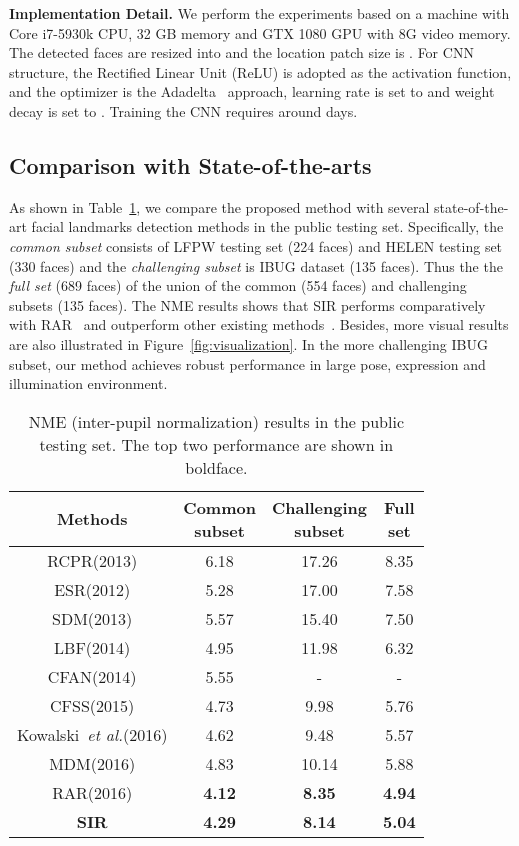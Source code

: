 \documentclass[letterpaper]{article} \usepackage{aaai18}  \usepackage{times}  \usepackage{helvet}  \usepackage{courier}  \usepackage{url}  \usepackage{graphicx}
\def\etal{{\em et al.}}
\begin{document}
{\noindent \textbf{Implementation Detail.}} We perform the experiments based on a machine with Core i7-5930k CPU, 32 GB memory and GTX 1080 GPU with 8G video memory. The detected faces are resized into  and the location patch size is . For CNN structure, the Rectified Linear Unit (ReLU) is adopted as the activation function, and the optimizer is the Adadelta~\cite{adadelta} approach, learning rate is set to  and weight decay is set to . Training the CNN requires around  days.

\subsection{Comparison with State-of-the-arts}
As shown in Table~\ref{tab:nme:public}, we compare the proposed method with several state-of-the-art facial landmarks detection methods in the  public testing set. Specifically, the \textit{common subset} consists of LFPW testing set (224 faces) and HELEN testing set (330 faces) and the \textit{challenging subset} is IBUG dataset (135 faces). Thus the the \textit{full set} (689 faces) of the union of the common (554 faces) and challenging subsets (135 faces). The NME results shows that SIR performs comparatively with RAR~\cite{XiaoFXLYK:RAR:ECCV2016} and outperform other existing methods~\cite{Cao:ESR:CVPR2012,Burgos:RCPR:ICCV2013,Xiong:SDM:CVPR2013,ShaoqinRen:LBF:CVPR2014,Zhu:CFSS:CVPR2015,KowalskiN:K-Regression:SPL16,Trigeorgis:MDM:CVPR16,XiaoFXLYK:RAR:ECCV2016}. Besides, more visual results are also illustrated in Figure~\ref{fig:visualization}. In the more challenging IBUG subset, our method achieves robust performance in large pose, expression and illumination environment.
\begin{table}[h]
\centering
\caption {NME (inter-pupil normalization) results in the  public testing set. The top two performance are shown in boldface.}
\label{tab:nme:public}
\centering
\setlength{\tabcolsep}{3.5pt}
\footnotesize{
\begin{tabular}{c c c c}
\hline
Methods &\makecell{Common\\subset} &\makecell{Challenging\\subset} &\makecell{Full\\set} \\
\hline


RCPR(2013) & 6.18 & 17.26 & 8.35 \\
ESR(2012)& 5.28 & 17.00 & 7.58 \\
SDM(2013) & 5.57 & 15.40 & 7.50 \\
LBF(2014) & 4.95 & 11.98 & 6.32\\
CFAN(2014) & 5.55 & - & - \\
CFSS(2015) & 4.73 & 9.98 & 5.76 \\
Kowalski~\etal(2016) & 4.62 & 9.48 & 5.57 \\
MDM(2016) & 4.83 & 10.14 & 5.88\\
RAR(2016) & \textbf{4.12} & \textbf{8.35} & \textbf{4.94}\\
\hline
\textbf{SIR} & \textbf{4.29} & \textbf{8.14} & \textbf{5.04} \\
\hline
\end{tabular}}
\end{table}
\end{document}
